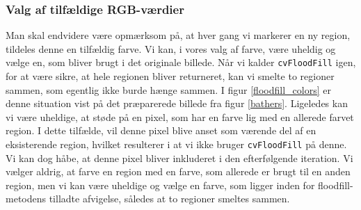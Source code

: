 {\subsubsection{Valg af tilfældige RGB-værdier}
Man skal endvidere være opmærksom på, at hver gang vi markerer en ny
region, tildeles denne en tilfældig farve.  Vi kan, i vores valg af
farve, være uheldig og vælge en, som bliver brugt i det originale
billede. Når vi kalder \texttt{cvFloodFill} igen, for at være sikre, at
hele regionen bliver returneret, kan vi smelte to regioner sammen, som
egentlig ikke burde hænge sammen. I figur \ref{floodfill_colors} er
denne situation vist på det præparerede billede fra figur \ref{bathers}.
Ligeledes kan vi være uheldige, at støde på en pixel, som har en farve
lig med en allerede farvet region. I dette tilfælde, vil denne pixel
blive anset som værende del af en eksisterende region, hvilket
resulterer i at vi ikke bruger \texttt{cvFloodFill} på denne. Vi kan dog
håbe, at denne pixel bliver inkluderet i den efterfølgende iteration.
Vi vælger aldrig, at farve en region med en farve, som allerede er brugt
til en anden region, men vi kan være uheldige og vælge en farve, som
ligger inden for floodfill-metodens tilladte afvigelse, således at to
regioner smeltes sammen.

}
